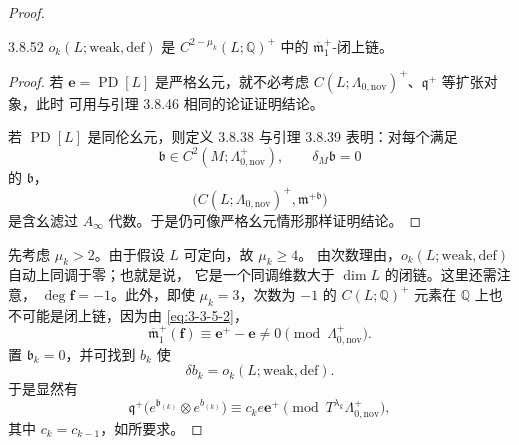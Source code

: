 \begin{proof}
\begin{lemma}{3.8.52}\label{lem:3-8-52}
$o_k(L;\mathrm{weak,def})$ 是
$C^{2-\mu_k}(L;\mathbb Q)^+$ 中的
$\overline{\mathfrak m}_1^+$-闭上链。
\end{lemma}

\begin{proof}
若 $\mathbf e=\operatorname{PD}[L]$ 是严格幺元，就不必考虑
$C(L;\Lambda_{0,\mathrm{nov}})^+$、$\mathfrak q^+$ 等扩张对象，此时
可用与引理 3.8.46 相同的论证证明结论。

若 $\operatorname{PD}[L]$ 是同伦幺元，则定义 3.8.38 与引理
3.8.39 表明：对每个满足
\[
 \mathfrak b\in C^2(M;\Lambda^+_{0,\mathrm{nov}}),
 \qquad \delta_M\mathfrak b=0
\]
的 $\mathfrak b$，
\[
 \bigl(C(L;\Lambda_{0,\mathrm{nov}})^+,
 \mathfrak m^{+\mathfrak b}\bigr)
\]
是含幺滤过 $A_\infty$ 代数。于是仍可像严格幺元情形那样证明结论。
\end{proof}

先考虑 $\mu_k>2$。由于假设 $L$ 可定向，故 $\mu_k\geq4$。
由次数理由，$o_k(L;\mathrm{weak,def})$ 自动上同调于零；也就是说，
它是一个同调维数大于 $\dim L$ 的闭链。这里还需注意，
$\deg\mathbf f=-1$。此外，即使 $\mu_k=3$，次数为 $-1$ 的
$C(L;\mathbb Q)^+$ 元素在 $\mathbb Q$ 上也不可能是闭上链，因为由
\eqref{eq:3-3-5-2}，
\[
 \overline{\mathfrak m}_1^+(\mathbf f)
 \equiv\mathbf e^+-\mathbf e\ne0
 \pmod{\Lambda^+_{0,\mathrm{nov}}}.
\]
置 $\mathfrak b_k=0$，并可找到 $b_k$ 使
\[
 \delta b_k=o_k(L;\mathrm{weak,def}).
\]
于是显然有
\[
 \mathfrak q^+\bigl(
 e^{\mathfrak b_{(k)}}\otimes e^{b_{(k)}}
 \bigr)
 \equiv c_ke\mathbf e^+
 \pmod{T^{\lambda_k}\Lambda^+_{0,\mathrm{nov}}},
\]
其中 $c_k=c_{k-1}$，如所要求。


\end{proof}
